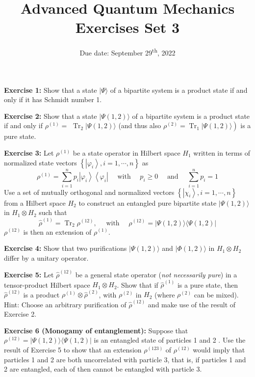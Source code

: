 \documentclass[12pt]{article}
\title{Advanced Quantum Mechanics\\Exercises Set 3\vspace{-0.5em}}
\date{Due date: September 29\textsuperscript{th}, 2022}
\newcommand{\be}{\begin{equation}}
\newcommand{\ee}{\end{equation}}
\begin{document}
\maketitle


\textbf{Exercise 1:} Show that a state \(|\Psi\rangle\) of a bipartite system is a product state if and only if it has Schmidt number 1.


\textbf{Exercise 2:} Show that a state \(|\Psi(1,2)\rangle\) of a bipartite system is a product state if and only if \(\rho^{(1)}=\)
\(\operatorname{Tr}_{2}|\Psi(1,2)\rangle\) (and thus also \(\left.\rho^{(2)}=\operatorname{Tr}_{1}|\Psi(1,2)\rangle\right)\) is a pure state.


\textbf{Exercise 3:} Let \(\rho^{(1)}\) be a state operator in Hilbert space \({H}_{1}\) written in terms of normalized state vectors
\(\left\{\left|\varphi_{i}\right\rangle, i=1, \cdots, n\right\}\) as
\be
\rho^{(1)}=\sum_{i=1}^{n} p_{i}\left|\varphi_{i}\right\rangle\left\langle\varphi_{i}\right| \quad \text{ with }\quad p_{i} \geq 0 \quad \text{ and } \quad \sum_{i=1}^{n} p_{i}=1
\ee
Use a set of mutually orthogonal and normalized vectors \(\left\{\left|\chi_{i}\right\rangle, i=1, \cdots, n\right\}\) from a Hilbert space
\({H}_{2}\) to construct an entangled pure bipartite state \(|\Psi(1,2)\rangle\) in \({H}_{1} \otimes {H}_{2}\) such that
\be
\hat{\rho}^{(1)}=\operatorname{Tr}_{2} \rho^{(12)}, \quad \text { with } \quad \rho^{(12)}=|\Psi(1,2)\rangle\langle\Psi(1,2)|
\ee
\(\rho^{(12)}\) is then an extension of \(\rho^{(1)}\).


\textbf{Exercise 4:} Show that two purifications \(|\Psi(1,2)\rangle\) and \(|\Phi(1,2)\rangle\) in \({H}_{1} \otimes {H}_{2}\) differ by a unitary operator.


\textbf{Exercise 5:} Let \(\hat{\rho}^{(12)}\) be a general state operator (\emph{not necessarily pure}) in a tensor-product Hilbert space
\({H}_{1} \otimes {H}_{2}\). Show that if \(\hat{\rho}^{(1)}\) is a pure state, then \(\hat{\rho}^{(12)}\) is a product \(\rho^{(1)} \otimes \hat{\rho}^{(2)}\), with \(\rho^{(2)}\) in \({H}_{2}\)
(where \(\rho^{(2)}\) can be mixed). Hint: Choose an arbitrary purification of \(\hat{\rho}^{(12)}\) and make use of
the result of Exercise 2.


\textbf{Exercise 6 (Monogamy of entanglement):} 
Suppose that \(\rho^{(12)}=|\Psi(1,2)\rangle\langle\Psi(1,2)|\) is an entangled state of
particles 1 and 2 . Use the result of Exercise 5 to show that an extension \(\rho^{(123)}\) of \(\rho^{(12)}\) would imply
that particles 1 and 2 are both uncorrelated with particle 3, that is, if particles 1 and 2 are
entangled, each of then cannot be entangled with particle 3.
\end{document}
